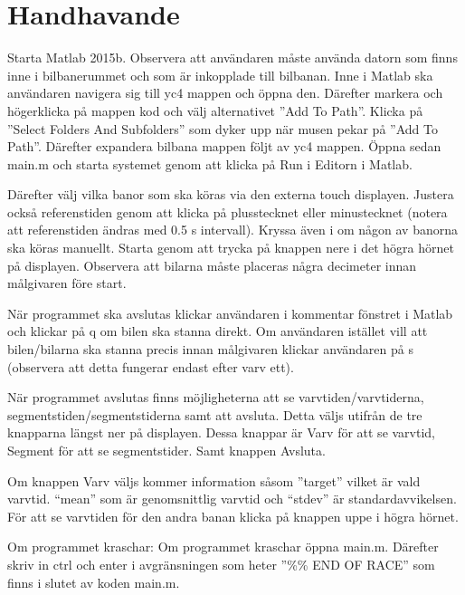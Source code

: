 \section{Handhavande}
Starta Matlab 2015b. Observera att användaren måste använda datorn som finns
inne i bilbanerummet och som är inkopplade till bilbanan. Inne i Matlab ska användaren navigera sig till yc4 mappen och öppna den. Därefter markera och högerklicka på mappen kod och välj alternativet ''Add To Path''. Klicka på ''Select Folders And Subfolders'' som dyker upp när musen pekar på ''Add To Path''. Därefter expandera bilbana mappen följt av yc4 mappen. Öppna sedan main.m och starta systemet genom att klicka på Run i Editorn i Matlab.

Därefter välj vilka banor som ska köras via den externa touch displayen. Justera också referenstiden genom att klicka på plusstecknet eller minustecknet (notera att referenstiden ändras med 0.5 s intervall). Kryssa även i om någon av banorna ska köras manuellt. Starta genom att trycka på knappen nere i det högra hörnet på displayen. Observera att bilarna måste placeras några decimeter innan målgivaren före start.

När programmet ska avslutas klickar användaren i kommentar fönstret i Matlab och
klickar på q om bilen ska stanna direkt. Om användaren istället vill att
bilen/bilarna ska stanna precis innan målgivaren klickar användaren på s
(observera att detta fungerar endast efter varv ett).

När programmet avslutas finns möjligheterna att se varvtiden/varvtiderna,
segmentstiden/segmentstiderna samt att avsluta. Detta väljs utifrån de tre
knapparna längst ner på displayen. Dessa knappar är Varv för att se varvtid,
Segment för att se segmentstider. Samt knappen Avsluta.

Om knappen Varv väljs kommer information såsom ''target'' vilket är vald varvtid.
“mean” som är genomsnittlig varvtid och “stdev” är standardavvikelsen. För att
se varvtiden för den andra banan klicka på knappen uppe i högra hörnet.

Om programmet kraschar: Om programmet kraschar öppna main.m. Därefter skriv in
ctrl och enter i avgränsningen som heter ''\%\% END OF RACE'' som finns i slutet av
koden main.m.
